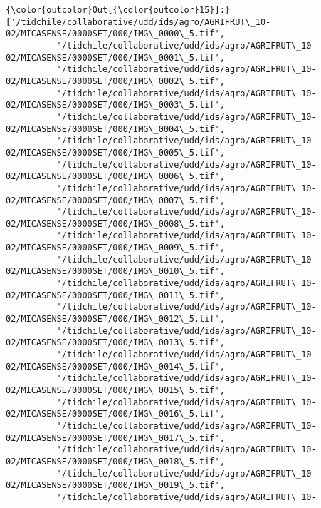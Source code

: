 \documentclass[11pt]{article}
\begin{document}
\begin{Verbatim}[commandchars=\\\{\}]
{\color{outcolor}Out[{\color{outcolor}15}]:} ['/tidchile/collaborative/udd/ids/agro/AGRIFRUT\_10-02/MICASENSE/0000SET/000/IMG\_0000\_5.tif',
          '/tidchile/collaborative/udd/ids/agro/AGRIFRUT\_10-02/MICASENSE/0000SET/000/IMG\_0001\_5.tif',
          '/tidchile/collaborative/udd/ids/agro/AGRIFRUT\_10-02/MICASENSE/0000SET/000/IMG\_0002\_5.tif',
          '/tidchile/collaborative/udd/ids/agro/AGRIFRUT\_10-02/MICASENSE/0000SET/000/IMG\_0003\_5.tif',
          '/tidchile/collaborative/udd/ids/agro/AGRIFRUT\_10-02/MICASENSE/0000SET/000/IMG\_0004\_5.tif',
          '/tidchile/collaborative/udd/ids/agro/AGRIFRUT\_10-02/MICASENSE/0000SET/000/IMG\_0005\_5.tif',
          '/tidchile/collaborative/udd/ids/agro/AGRIFRUT\_10-02/MICASENSE/0000SET/000/IMG\_0006\_5.tif',
          '/tidchile/collaborative/udd/ids/agro/AGRIFRUT\_10-02/MICASENSE/0000SET/000/IMG\_0007\_5.tif',
          '/tidchile/collaborative/udd/ids/agro/AGRIFRUT\_10-02/MICASENSE/0000SET/000/IMG\_0008\_5.tif',
          '/tidchile/collaborative/udd/ids/agro/AGRIFRUT\_10-02/MICASENSE/0000SET/000/IMG\_0009\_5.tif',
          '/tidchile/collaborative/udd/ids/agro/AGRIFRUT\_10-02/MICASENSE/0000SET/000/IMG\_0010\_5.tif',
          '/tidchile/collaborative/udd/ids/agro/AGRIFRUT\_10-02/MICASENSE/0000SET/000/IMG\_0011\_5.tif',
          '/tidchile/collaborative/udd/ids/agro/AGRIFRUT\_10-02/MICASENSE/0000SET/000/IMG\_0012\_5.tif',
          '/tidchile/collaborative/udd/ids/agro/AGRIFRUT\_10-02/MICASENSE/0000SET/000/IMG\_0013\_5.tif',
          '/tidchile/collaborative/udd/ids/agro/AGRIFRUT\_10-02/MICASENSE/0000SET/000/IMG\_0014\_5.tif',
          '/tidchile/collaborative/udd/ids/agro/AGRIFRUT\_10-02/MICASENSE/0000SET/000/IMG\_0015\_5.tif',
          '/tidchile/collaborative/udd/ids/agro/AGRIFRUT\_10-02/MICASENSE/0000SET/000/IMG\_0016\_5.tif',
          '/tidchile/collaborative/udd/ids/agro/AGRIFRUT\_10-02/MICASENSE/0000SET/000/IMG\_0017\_5.tif',
          '/tidchile/collaborative/udd/ids/agro/AGRIFRUT\_10-02/MICASENSE/0000SET/000/IMG\_0018\_5.tif',
          '/tidchile/collaborative/udd/ids/agro/AGRIFRUT\_10-02/MICASENSE/0000SET/000/IMG\_0019\_5.tif',
          '/tidchile/collaborative/udd/ids/agro/AGRIFRUT\_10-02/MICASENSE/0000SET/000/IMG\_0020\_5.tif',
          '/tidchile/collaborative/udd/ids/agro/AGRIFRUT\_10-02/MICASENSE/0000SET/000/IMG\_0021\_5.tif',
          '/tidchile/collaborative/udd/ids/agro/AGRIFRUT\_10-02/MICASENSE/0000SET/000/IMG\_0022\_5.tif',
          '/tidchile/collaborative/udd/ids/agro/AGRIFRUT\_10-02/MICASENSE/0000SET/000/IMG\_0023\_5.tif',

\end{Verbatim}
\end{document}

